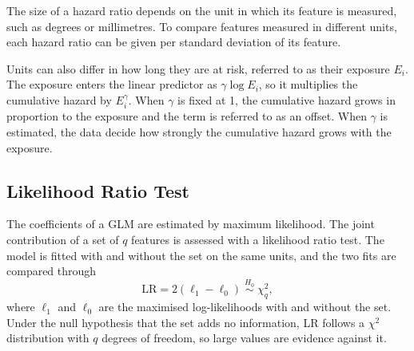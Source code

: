 The size of a hazard ratio depends on the unit in which its feature is measured, such as degrees or
millimetres. To compare features measured in different units, each hazard ratio can be given per
standard deviation of its feature.

Units can also differ in how long they are at risk, referred to as their exposure $E_i$. The exposure
enters the linear predictor as $\gamma \log E_i$, so it multiplies the cumulative hazard by
$E_i^{\gamma}$. When $\gamma$ is fixed at 1, the cumulative hazard grows in proportion to the exposure
and the term is referred to as an offset. When $\gamma$ is estimated, the data decide how strongly the
cumulative hazard grows with the exposure.

\subsection{Likelihood Ratio Test}
\label{sec:tech-lr}

The coefficients of a GLM are estimated by maximum likelihood. The joint contribution of a set of $q$
features is assessed with a likelihood ratio test. The model is fitted with and without the set on the
same units, and the two fits are compared through \cite[Section~5.7]{dobson2002glm}
\begin{equation}
  \mathrm{LR} = 2\left(\ell_1 - \ell_0\right) \;\overset{H_0}{\sim}\; \chi^2_q ,
  \label{eq:tech-lr}
\end{equation}
where $\ell_1$ and $\ell_0$ are the maximised log-likelihoods with and without the set. Under the null
hypothesis that the set adds no information, LR follows a $\chi^2$ distribution with $q$ degrees of
freedom, so large values are evidence against it.

